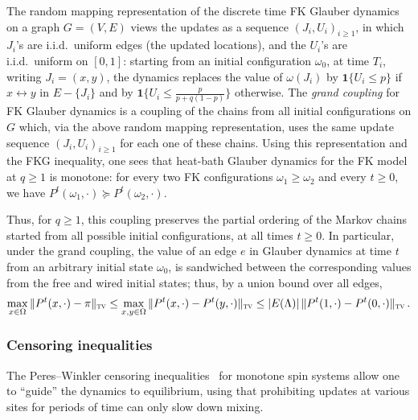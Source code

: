 \documentclass[reqno,11pt]{amsart}
\numberwithin{equation}{section}
\newcommand{\one}{\mathbf{1}}
\theoremstyle{definition}{
\newtheorem{example}[theorem]{Example}
\newtheorem{definition}[theorem]{Definition}
\newtheorem*{definition*}{Definition}
\newtheorem{problem}[theorem]{Problem}
\newtheorem{question}[theorem]{Question}
\newtheorem{remark}[theorem]{Remark}
}
\newcommand{\tv}{{\textsc{tv}}}
\begin{document}
The random mapping representation of the discrete time FK Glauber dynamics on a graph $G=(V,E)$ views the updates as a sequence $(J_i,U_i)_{i\geq 1}$, in which $J_i$'s are i.i.d.\ uniform edges (the updated locations), and the $U_i$'s are i.i.d.\ uniform on $[0,1]$: starting from an initial configuration $\omega_0$, at time $T_i$, writing $J_i=(x,y)$, the dynamics replaces the value of $\omega(J_i)$ by $\one\{U_i\leq p\}$ if $x\longleftrightarrow y$ in $E-\{J_i\}$ and by $\one\{U_i\leq \frac{p}{p+q(1-p)}\}$ otherwise.
The \emph{grand coupling} for FK Glauber dynamics is a coupling of the chains from all initial configurations on $G$ which, via the above random mapping representation, uses the same update sequence $(J_i,U_i)_{i\geq 1}$ for each one of these chains. Using this representation and the FKG inequality, one sees that heat-bath Glauber dynamics for the FK model at $q\geq 1$ is monotone: for every two FK configurations $\omega_1\ge \omega_2$ and every $t\ge 0$, we have $P^t(\omega_1,\cdot)\succeq P^t(\omega_2,\cdot)$.

Thus, for $q\geq 1$, this coupling preserves the partial ordering of the Markov chains started from all possible initial configurations, at all times $t\geq 0$. In particular, under the grand coupling, the value of an edge $e$ in Glauber dynamics at time $t$ from an arbitrary initial state $\omega_0$, is sandwiched between the corresponding values from the free and wired initial states; thus, by a union bound over all edges,
\begin{align}\label{eq:init-config-comparison}
\max_{x\in \Omega} \|P^t (x,\cdot)-\pi\|_\tv \leq \max_{x,y\in\Omega}\|P^t(x,\cdot)-P^t(y,\cdot)\|_{\tv} \leq  |E(\Lambda)|\, \|P^t(1,\cdot)-P^t(0,\cdot)\|_{\tv}\,.
\end{align}


\subsubsection*{Censoring inequalities}%

The Peres--Winkler censoring inequalities~\cite{PW13} for monotone spin systems allow one to ``guide'' the dynamics to equilibrium, using that prohibiting updates at various sites for periods of time can only slow down mixing.
\end{document}
